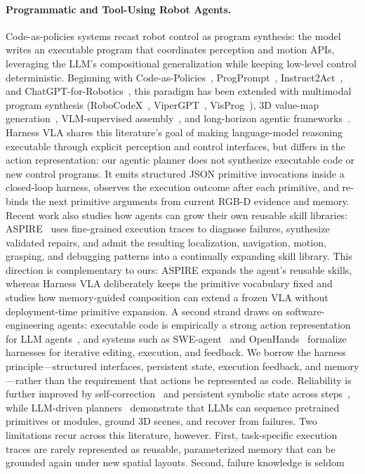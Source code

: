 \documentclass[11pt]{article}
\begin{document}
	\paragraph{Programmatic and Tool-Using Robot Agents.} Code-as-policies systems recast robot control as program synthesis: the model writes an executable program that coordinates perception and motion APIs, leveraging the LLM's compositional generalization while keeping low-level control deterministic. Beginning with Code-as-Policies~\citep{liang2023code}, ProgPrompt~\citep{singh2023progprompt}, Instruct2Act~\citep{huang2023instruct2act}, and ChatGPT-for-Robotics~\citep{vemprala2023chatgpt}, this paradigm has been extended with multimodal program synthesis (RoboCodeX~\citep{mu2024robocodex}, ViperGPT~\citep{suris2023vipergpt}, VisProg~\citep{gupta2023visprog}), 3D value-map generation~\citep{huang2023voxposer}, VLM-supervised assembly~\citep{goldberg2024bloxnet}, and long-horizon agentic frameworks~\citep{li2026roboclaw, shi2025maestro}. Harness VLA shares this literature's goal of making language-model reasoning executable through explicit perception and control interfaces, but differs in the action representation: our agentic planner does not synthesize executable code or new control programs. It emits structured JSON primitive invocations inside a closed-loop harness, observes the execution outcome after each primitive, and re-binds the next primitive arguments from current RGB-D evidence and memory. Recent work also studies how agents can grow their own reusable skill libraries: ASPIRE~\citep{lu2026aspire} uses fine-grained execution traces to diagnose failures, synthesize validated repairs, and admit the resulting localization, navigation, motion, grasping, and debugging patterns into a continually expanding skill library. This direction is complementary to ours: ASPIRE expands the agent's reusable skills, whereas Harness VLA deliberately keeps the primitive vocabulary fixed and studies how memory-guided composition can extend a frozen VLA without deployment-time primitive expansion. A second strand draws on software-engineering agents: executable code is empirically a strong action representation for LLM agents~\citep{wang2024codeact}, and systems such as SWE-agent~\citep{yang2024sweagent} and OpenHands~\citep{wang2025openhands} formalize harnesses for iterative editing, execution, and feedback. We borrow the harness principle---structured interfaces, persistent state, execution feedback, and memory---rather than the requirement that actions be represented as code. Reliability is further improved by self-correction~\citep{shinn2023reflexion, madaan2023selfrefine, chen2023selfdebug} and persistent symbolic state across steps~\citep{yoneda2024statler}, while LLM-driven planners~\citep{ahn2022saycan, huang2022inner, mu2023embodiedgpt, zeng2023socratic, liu2023llmplanning, chen2024autotamp, rana2023sayplan, mandi2024roco} demonstrate that LLMs can sequence pretrained primitives or modules, ground 3D scenes, and recover from failures. Two limitations recur across this literature, however. First, task-specific execution traces are rarely represented as reusable, parameterized memory that can be grounded again under new spatial layouts. Second, failure knowledge is seldom 
\end{document}
